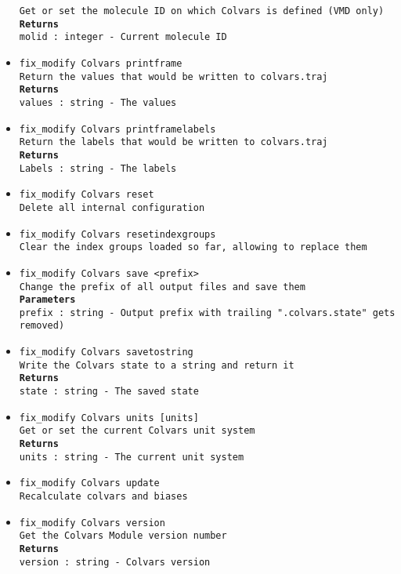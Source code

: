 \begin{itemize}
\texttt{Get or set the molecule ID on which Colvars is defined (VMD only)}
\\
\texttt{\textbf{Returns}}
\\
\texttt{molid : integer - Current molecule ID}
\item \texttt{fix\_modify Colvars printframe}
\\
\texttt{Return the values that would be written to colvars.traj}
\\
\texttt{\textbf{Returns}}
\\
\texttt{values : string - The values}
\item \texttt{fix\_modify Colvars printframelabels}
\\
\texttt{Return the labels that would be written to colvars.traj}
\\
\texttt{\textbf{Returns}}
\\
\texttt{Labels : string - The labels}
\item \texttt{fix\_modify Colvars reset}
\\
\texttt{Delete all internal configuration}
\item \texttt{fix\_modify Colvars resetindexgroups}
\\
\texttt{Clear the index groups loaded so far, allowing to replace them}
\item \texttt{fix\_modify Colvars save <prefix>}
\\
\texttt{Change the prefix of all output files and save them}
\\
\texttt{\textbf{Parameters}}
\\
\texttt{prefix : string - Output prefix with trailing ".colvars.state" gets removed)}
\item \texttt{fix\_modify Colvars savetostring}
\\
\texttt{Write the Colvars state to a string and return it}
\\
\texttt{\textbf{Returns}}
\\
\texttt{state : string - The saved state}
\item \texttt{fix\_modify Colvars units [units]}
\\
\texttt{Get or set the current Colvars unit system}
\\
\texttt{\textbf{Returns}}
\\
\texttt{units : string - The current unit system}
\item \texttt{fix\_modify Colvars update}
\\
\texttt{Recalculate colvars and biases}
\item \texttt{fix\_modify Colvars version}
\\
\texttt{Get the Colvars Module version number}
\\
\texttt{\textbf{Returns}}
\\
\texttt{version : string - Colvars version}
\end{itemize}
